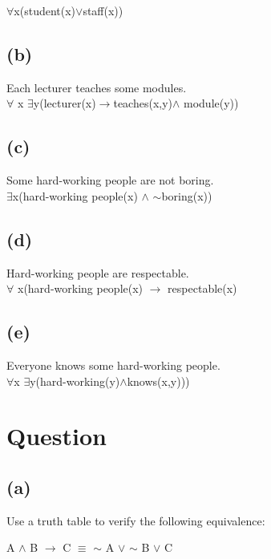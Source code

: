 \documentclass[12pt,a4paper]{article}
\begin{document}
	$\forall$x(student(x)$\lor$staff(x))
		
		
		
		\subsection{(b)}
		Each lecturer teaches some modules.	\\
		$\forall$ x $\exists$y(lecturer(x)$\rightarrow$teaches(x,y)$\wedge$ module(y))
		
		
		
		
		
		\subsection{(c)}
		Some hard-working people are not boring.\\
		$\exists$x(hard-working people(x) $\wedge$ $\mathord{\sim}$boring(x))
		
		
		
		
		
		\subsection{(d)}
		Hard-working people are respectable.\\
		
		
		
		$\forall$ x(hard-working people(x) $\rightarrow$ respectable(x)\\
	
		
		
		
		\subsection{(e)}
		Everyone knows some hard-working people.\\
	    $\forall$x 	$\exists$y(hard-working(y)$\wedge$knows(x,y)))
		
		
		
	\section{Question}
		\subsection{(a)}
	
		Use a truth table to verify the following equivalence:
		
		
			A $\wedge$ B $\rightarrow$ C $\equiv$ $\mathord{\sim}$ A $\lor$ $\mathord{\sim}$ B $\lor$ C
		
\end{document}
